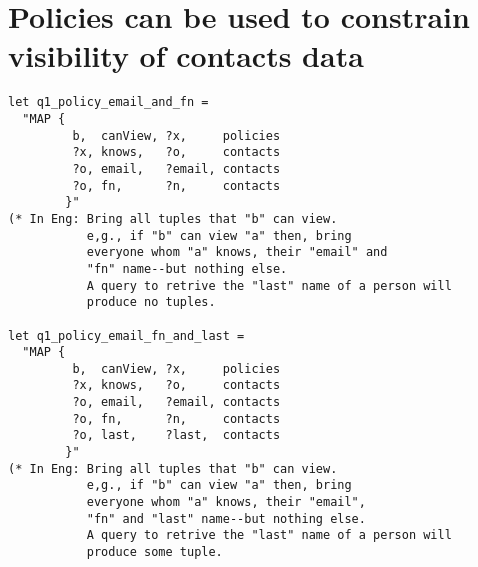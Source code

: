 \documentclass[runningheads,a4paper]{llncs}
\begin{document}
\section{Policies can be used to constrain visibility of contacts data}

\begin{verbatim}
let q1_policy_email_and_fn =
  "MAP {
         b,  canView, ?x,     policies
         ?x, knows,   ?o,     contacts
         ?o, email,   ?email, contacts
         ?o, fn,      ?n,     contacts
        }"
(* In Eng: Bring all tuples that "b" can view. 
           e,g., if "b" can view "a" then, bring 
           everyone whom "a" knows, their "email" and 
           "fn" name--but nothing else.
           A query to retrive the "last" name of a person will 
           produce no tuples.

let q1_policy_email_fn_and_last =
  "MAP {
         b,  canView, ?x,     policies
         ?x, knows,   ?o,     contacts
         ?o, email,   ?email, contacts
         ?o, fn,      ?n,     contacts
         ?o, last,    ?last,  contacts
        }"
(* In Eng: Bring all tuples that "b" can view. 
           e,g., if "b" can view "a" then, bring 
           everyone whom "a" knows, their "email", 
           "fn" and "last" name--but nothing else.
           A query to retrive the "last" name of a person will 
           produce some tuple.
\end{verbatim}




\end{document}
